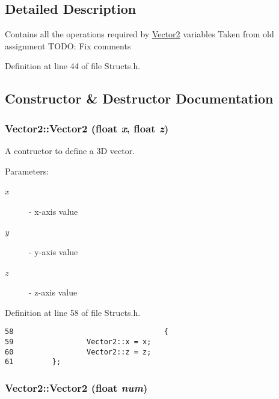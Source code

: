 \subsection{Detailed Description}
Contains all the operations required by \hyperlink{struct_vector2}{Vector2} variables Taken from old assignment TODO: Fix comments 

Definition at line 44 of file Structs.h.

\subsection{Constructor \& Destructor Documentation}
\hypertarget{struct_vector2_24d2d059ca7d66113abac07ef1854b57}{
\subsubsection[Vector2]{\setlength{\rightskip}{0pt plus 5cm}Vector2::Vector2 (float {\em x}, \/  float {\em z})}}
\label{struct_vector2_24d2d059ca7d66113abac07ef1854b57}


A contructor to define a 3D vector. 

\begin{Desc}
\item[Parameters:]
\begin{description}
\item[{\em x}]- x-axis value \item[{\em y}]- y-axis value \item[{\em z}]- z-axis value \end{description}
\end{Desc}


Definition at line 58 of file Structs.h.

\begin{Code}\begin{verbatim}58                                   {
59                 Vector2::x = x;
60                 Vector2::z = z;
61         };
\end{verbatim}
\end{Code}


\hypertarget{struct_vector2_bd2746f75192b018c15831940d080b38}{
\subsubsection[Vector2]{\setlength{\rightskip}{0pt plus 5cm}Vector2::Vector2 (float {\em num})}}
\label{struct_vector2_bd2746f75192b018c15831940d080b38}


